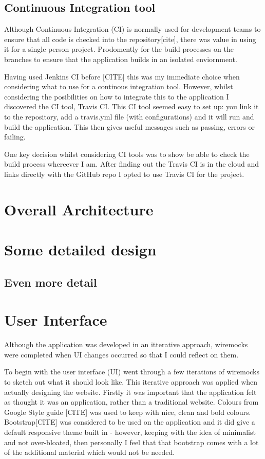\subsection{Continuous Integration tool}
Although Continuous Integration (CI) is normally used for development teams to ensure that all code is checked into the repository[cite], there was value in using it for a single person project. Prodomently for the build processes on the branches to ensure that the application builds in an isolated enviornment. 

Having used Jenkins CI before [CITE] this was my immediate choice when considering what to use for a continous integration tool. However, whilst considering the posibilities on how to integrate this to the application I discovered the CI tool, Travis CI. This CI tool seemed easy to set up: you link it to the repository, add a travis.yml file (with configurations) and it will run and build the application. This then gives useful messages such as passing, errors or failing. 

One key decision whilst considering CI tools was to show be able to check the build process whereever I am. After finding out the Travis CI is in the cloud and links directly with the GitHub repo I opted to use Travis CI for the project.


\section{Overall Architecture}

\section{Some detailed design}

\subsection{Even more detail}

\section{User Interface}
Although the application was developed in an itterative approach, wiremocks were completed when UI changes occurred so that I could reflect on them.

To begin with the user interface (UI) went through a few iterations of wiremocks to sketch out what it should look like.  This iterative approach was applied when actually designing the website. Firstly it was important that the application felt as thought it was an application, rather than a traditional website. Colours from Google Style guide [CITE] was used to keep with nice, clean and bold colours. Bootstrap[CITE] was considered to be used on the application and it did give a default responsive theme built in - however, keeping with the idea of minimalist and not over-bloated, then personally I feel that that bootstrap comes with a lot of the additional material which would not be needed. 

